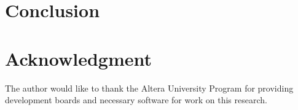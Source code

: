 \documentclass[conference]{IEEEtran}
\begin{document}
\section{Conclusion}


\section*{Acknowledgment}
The author would like to thank the Altera University Program for providing development boards and necessary software for work on this research.






\end{document}
